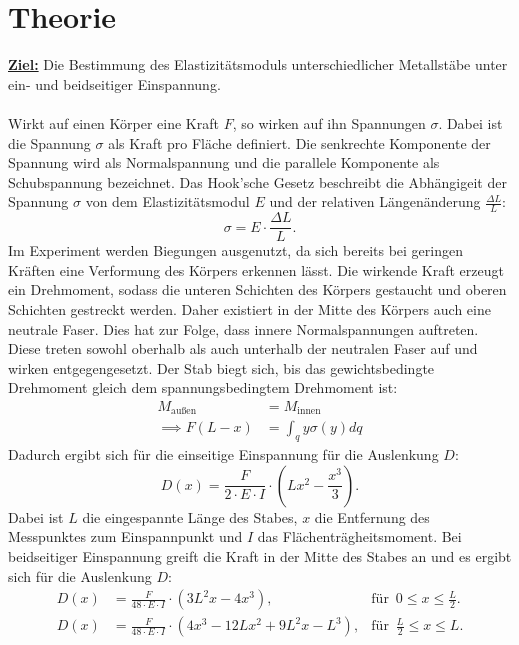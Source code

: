\section{Theorie \cite{sample}}

\textbf{\underline{Ziel:}}
Die Bestimmung des Elastizitätsmoduls unterschiedlicher Metallstäbe unter ein- und beidseitiger Einspannung.
\\
\\
Wirkt auf einen Körper eine Kraft $F$, so wirken auf ihn Spannungen $\sigma$.
Dabei ist die Spannung $\sigma$ als Kraft pro Fläche definiert.
Die senkrechte Komponente der Spannung wird als Normalspannung und die parallele Komponente als Schubspannung bezeichnet.
Das Hook'sche Gesetz beschreibt die Abhängigeit der Spannung $\sigma$ von dem Elastizitätsmodul $E$
und der relativen Längenänderung $\frac{\Delta L}{L}$:
\begin{equation}
  \sigma = E \cdot \frac{\Delta L}{L}.
\end{equation}
Im Experiment werden Biegungen ausgenutzt, da sich bereits bei geringen Kräften eine Verformung des Körpers erkennen lässt.
Die wirkende Kraft erzeugt ein Drehmoment, sodass
die unteren Schichten des Körpers gestaucht und oberen Schichten gestreckt werden.
Daher existiert in der Mitte des Körpers auch eine neutrale Faser.
Dies hat zur Folge, dass innere Normalspannungen auftreten.
Diese treten sowohl oberhalb als auch unterhalb der neutralen Faser auf und wirken entgegengesetzt.
Der Stab biegt sich, bis das gewichtsbedingte Drehmoment gleich dem spannungsbedingtem Drehmoment ist:
\begin{align}
  M_{\text{außen}} &= M_{\text{innen}} \\
  \implies F(L-x) &= \int_q y \sigma (y) dq
\end{align}
Dadurch ergibt sich für die einseitige Einspannung für die Auslenkung $D$:
\begin{equation}
  D(x)= \frac {F}{2 \cdot E \cdot I} \cdot (Lx^2-\frac{x^3}{3}).
  \label{eqn:ein}
\end{equation}
Dabei ist $L$ die eingespannte Länge des Stabes, $x$ die Entfernung des Messpunktes zum Einspannpunkt und $I$ das Flächenträgheitsmoment.
Bei beidseitiger Einspannung greift die Kraft in der Mitte des Stabes an und es ergibt sich für die Auslenkung $D$:
\begin{align}
D(x) &=  \frac {F}{48 \cdot E \cdot I} \cdot (3L^2x-4x^3), & \text{für} \,\,\, 0 \leq x \leq \frac{L}{2}.
\label{eqn:beid1}\\
D(x) &=  \frac {F}{48 \cdot E \cdot I} \cdot (4x^3-12Lx^2+9L^2x-L^3), & \text{für}\,\,\, \frac{L}{2} \leq x \leq L.
\label{eqn:beid2}
\end{align}
